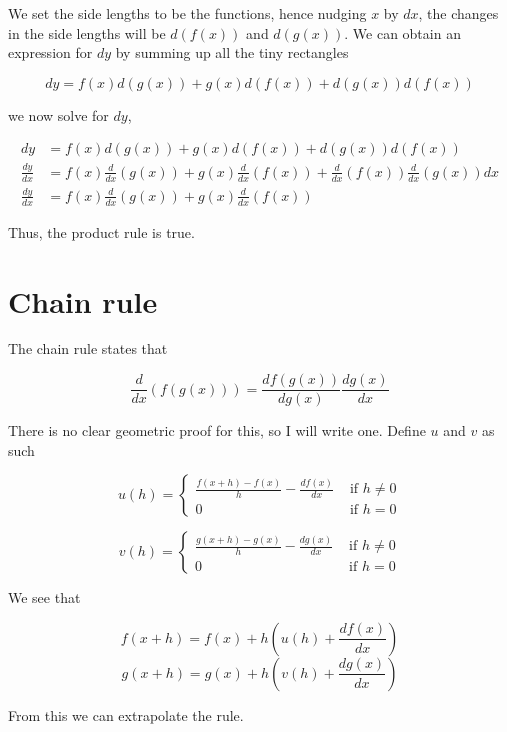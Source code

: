 \documentclass[a4paper,12pt,oneside]{book}
\begin{document}
\noindent We set the side lengths to be the functions, hence nudging $x$ by $dx$, the changes in the side lengths will be $d(f(x))$ and $d(g(x))$. We can obtain an expression for $dy$ by summing up all the tiny rectangles

$$dy=f(x)d(g(x))+g(x)d(f(x))+d(g(x))d(f(x))$$

\noindent we now solve for $dy$,

$$\begin{aligned}
dy&=f(x)d(g(x))+g(x)d(f(x))+d(g(x))d(f(x))\\
\frac{dy}{dx}&=f(x)\frac{d}{dx}(g(x))+g(x)\frac{d}{dx}(f(x))+\frac{d}{dx}(f(x))\frac{d}{dx}(g(x))dx\\
\frac{dy}{dx}&=f(x)\frac{d}{dx}(g(x))+g(x)\frac{d}{dx}(f(x))
\end{aligned}$$

\noindent Thus, the product rule is true.

\section{Chain rule}

The chain rule states that

$$\frac{d}{dx}(f(g(x)))=\frac{df(g(x))}{dg(x)}\frac{dg(x)}{dx}$$

\noindent There is no clear geometric proof for this, so I will write one. Define $u$ and $v$ as such

$$u(h)=\left\{ {\begin{array}{*{20}{l}}{\displaystyle \frac{{f( {x + h}) - f( x)}}{h} - \frac{df(x)}{dx}}&{{\mbox{  if }}h \ne 0}\\0&{{\mbox{  if }}h = 0}\end{array}} \right.$$

$$v(h)=\left\{ {\begin{array}{*{20}{l}}{\displaystyle \frac{{g( {x + h}) - g( x)}}{h} - \frac{dg(x)}{dx}}&{{\mbox{  if }}h \ne 0}\\0&{{\mbox{  if }}h = 0}\end{array}} \right.$$

\noindent We see that

$$f(x+h)=f(x)+h\left(u(h)+\frac{df(x)}{dx}\right)$$
$$g(x+h)=g(x)+h\left(v(h)+\frac{dg(x)}{dx}\right)$$

\noindent From this we can extrapolate the rule.
\end{document}
